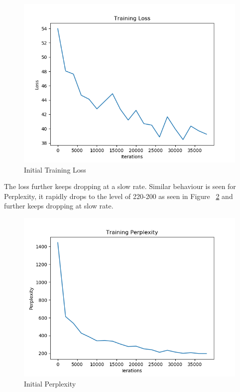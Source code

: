 \documentclass[11pt,a4paper]{article}
\begin{document}
\begin{figure}[!htbp]
\includegraphics[width=\linewidth]{de_key-value_loss_1.png}
\caption{Initial Training Loss}
\label{fig29}
\end{figure}



The loss further keeps dropping at a slow rate. Similar behaviour is seen for Perplexity, it rapidly drops to the level of 220-200 as seen in Figure ~\ref{fig31} and further keeps dropping at slow rate.


\begin{figure}[!htbp]
\includegraphics[width=\linewidth]{de_key-value_ppl_1.png}
\caption{Initial Perplexity}
\label{fig31}
\end{figure}
\end{document}
